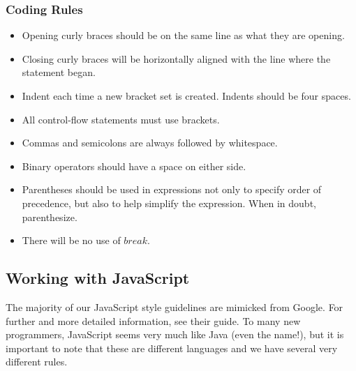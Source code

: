\documentclass[12pt]{article}
\begin{document}
\subsubsection{Coding Rules}
\begin{itemize}
\item Opening curly braces should be on the same line as what they are opening.
\item Closing curly braces will be horizontally aligned with the line where the statement began.
\item Indent each time a new bracket set is created.  Indents should be four spaces.
\item All control-flow statements must use brackets.
\item Commas and semicolons are always followed by whitespace.
\item Binary operators should have a space on either side.
\item Parentheses should be used in expressions not only to specify order of precedence, but also to help simplify the expression. When in doubt, parenthesize. 
\item There will be no use of $break$.
\end{itemize}


\subsection{Working with JavaScript}
The majority of our JavaScript style guidelines are mimicked from Google\cite{JavaScriptStyle-Google}.  For further and more detailed information, see their guide.  To many new programmers, JavaScript seems very much like Java (even the name!), but it is important to note that these are different languages and we have several very different rules.
\end{document}
